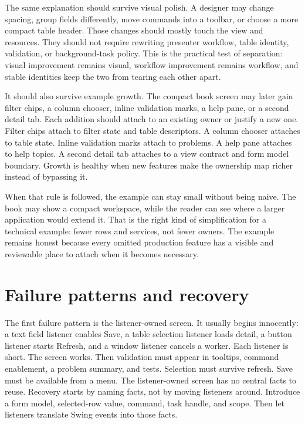 The same explanation should survive visual polish. A designer may change
spacing, group fields differently, move commands into a toolbar, or choose a
more compact table header. Those changes should mostly touch the view and
resources. They should not require rewriting presenter workflow, table
identity, validation, or background-task policy. This is the practical test of
separation: visual improvement remains visual, workflow improvement remains
workflow, and stable identities keep the two from tearing each other apart.

It should also survive example growth. The compact book screen may later gain
filter chips, a column chooser, inline validation marks, a help pane, or a
second detail tab. Each addition should attach to an existing owner or justify
a new one. Filter chips attach to filter state and table descriptors. A column
chooser attaches to table state. Inline validation marks attach to problems.
A help pane attaches to help topics. A second detail tab attaches to a view
contract and form model boundary. Growth is healthy when new features make the
ownership map richer instead of bypassing it.

When that rule is followed, the example can stay small without being naive.
The book may show a compact workspace, while the reader can see where a larger
application would extend it. That is the right kind of simplification for a
technical example: fewer rows and services, not fewer owners.
The example remains honest because every omitted production feature has a
visible and reviewable place to attach when it becomes necessary.

\section{Failure patterns and recovery}

The first failure pattern is the listener-owned screen. It usually begins
innocently: a text field listener enables Save, a table selection listener
loads detail, a button listener starts Refresh, and a window listener cancels a
worker. Each listener is short. The screen works. Then validation must appear
in tooltips, command enablement, a problem summary, and tests. Selection must
survive refresh. Save must be available from a menu. The listener-owned screen
has no central facts to reuse. Recovery starts by naming facts, not by moving
listeners around. Introduce a form model, selected-row value, command, task
handle, and scope. Then let listeners translate Swing events into those facts.

